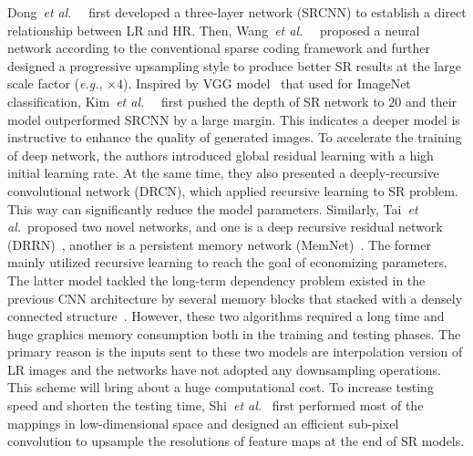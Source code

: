 \documentclass[sigconf]{acmart}
\newcommand{\etal}{\emph{et al.}~}
\newcommand{\eg}{\emph{e.g.}}
\begin{document}
Dong~\etal~\cite{SRCNN,SRCNN-Ex} first developed a three-layer network (SRCNN) to establish a direct relationship between LR and HR. Then, Wang~\etal~\cite{CSCN} proposed a neural network according to the conventional sparse coding framework and further designed a progressive upsampling style to produce better SR results at the large scale factor (\eg, $\times 4$). Inspired by VGG model~\cite{VGG} that used for ImageNet classification, Kim~\etal~\cite{VDSR,DRCN} first pushed the depth of SR network to $20$ and their model outperformed SRCNN by a large margin. This indicates a deeper model is instructive to enhance the quality of generated images. To accelerate the training of deep network, the authors introduced global residual learning with a high initial learning rate. At the same time, they also presented a deeply-recursive convolutional network (DRCN), which applied recursive learning to SR problem. This way can significantly reduce the model parameters. Similarly, Tai~\etal proposed two novel networks, and one is a deep recursive residual network (DRRN)~\cite{DRRN}, another is a persistent memory network (MemNet)~\cite{MemNet}. The former mainly utilized recursive learning to reach the goal of economizing parameters. The latter model tackled the long-term dependency problem existed in the previous CNN architecture by several memory blocks that stacked with a densely connected structure~\cite{DenseNet}. However, these two algorithms required a long time and huge graphics memory consumption both in the training and testing phases. The primary reason is the inputs sent to these two models are interpolation version of LR images and the networks have not adopted any downsampling operations. This scheme will bring about a huge computational cost. To increase testing speed and shorten the testing time, Shi~\etal\cite{ESPCN} first performed most of the mappings in low-dimensional space and designed an efficient sub-pixel convolution to upsample the resolutions of feature maps at the end of SR models.
\end{document}
